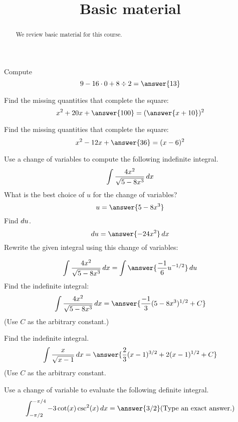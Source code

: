 \documentclass{ximera}
\title[Refresh:]{Basic material}
\begin{document}
\begin{abstract}
  We review basic material for this course. 
\end{abstract}
\maketitle

\begin{problem}
  Compute
  \[
  9-16\cdot 0 + 8\div 2 = \answer{13}
  \]
\end{problem}





\begin{problem}
  Find the missing quantities that complete the square:
  \[
   x^2 + 20x +\answer{100} = (\answer{x+10})^2 
   \]
\end{problem}


\begin{problem}
  Find the missing quantities that complete the square:
  \[
  x^2-12x + \answer{36} = (x-6)^2
  \]
\end{problem}


\begin{problem}
  Use a change of variables to compute the following indefinite
  integral.
  \[
  \int \frac{4x^2}{\sqrt{5 - 8x^3}} \mathop{}\!d x
  \]
  What is the best choice of $u$ for the change of variables?
  \[
  u = \answer{5 - 8x^3}
  \]
  Find $\mathop{}\!d u$.
  \[
  \d u = \answer{-24x^2} \d x
  \]
  Rewrite the given integral using this change of variables:
  
  \[
  \int \frac{4x^2}{\sqrt{5 - 8x^3}} \d x = \int \answer{\frac{-1}{6} u^{-1/2}} \d u
  \]
  Find the indefinite integral:
  \[
  \int \frac{4x^2}{\sqrt{5 - 8x^3}} \d x = \answer{\frac{-1}{3}(5-8x^3)^{1/2} + C}
  \]
  (Use $C$ as the arbitrary constant.)
\end{problem}


\begin{problem}
  Find the indefinite integral.
  \[
    \int \frac{x}{\sqrt{x - 1}} \d x = \answer{\frac{2}{3}(x-1)^{3/2} + 2(x - 1)^{1/2} + C}
  \]  
  (Use $C$ as the arbitrary constant.
\end{problem}


\begin{problem}
  Use a change of variable to evaluate the following definite integral.
  \[
    \int_{-\pi/2}^{-\pi/4} -3 \cot(x) \csc^2(x) \d x = \answer{3/2} \text{(Type an exact answer.)}
  \]
\end{problem}
\end{document}
